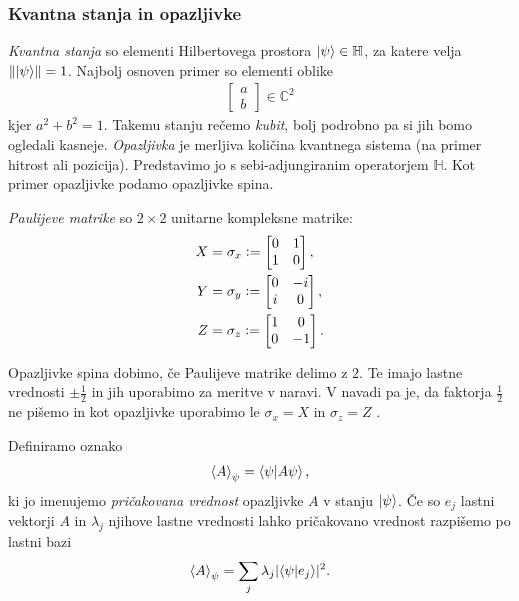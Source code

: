 \documentclass[mat1]{fmfdelo}
\newcommand{\C}{\mathbb C}
\newcommand{\Hb}{\mathbb H}
\newcommand{\defeq}{\vcentcolon=}
\begin{document}
\subsubsection{Kvantna stanja in opazljivke}
\emph{Kvantna stanja} so elementi Hilbertovega prostora \(\ket\psi\in\Hb\), za katere velja \(\norm{\ket\psi} = 1\). Najbolj osnoven primer so elementi oblike 
\begin{align*}
    \begin{bmatrix}a\\b\end{bmatrix} \in \C^2
\end{align*}
kjer \(a^2 + b^2 = 1\). Takemu stanju rečemo \emph{kubit}, bolj podrobno pa si jih bomo ogledali kasneje. \emph{Opazljivka} je merljiva količina kvantnega sistema (na primer hitrost ali pozicija). Predstavimo jo s sebi-adjungiranim operatorjem \(\Hb\). Kot primer opazljivke podamo opazljivke spina.
\begin{definicija} \label{Pauli} \emph{Paulijeve matrike} so \(2\times 2\) unitarne kompleksne matrike:
    \begin{align*}
        X &= \sigma_x \defeq \begin{bmatrix}
            0&1\\
            1&0
        \end{bmatrix},\\
        Y &= \sigma_y \defeq \begin{bmatrix}
            0&-i\\
            i&0
        \end{bmatrix},\\
        Z &= \sigma_z \defeq \begin{bmatrix}
            1&0\\
            0&-1
        \end{bmatrix}.
    \end{align*}
\end{definicija}
Opazljivke spina dobimo, če Paulijeve matrike delimo z \(2\). Te imajo lastne vrednosti \(\pm \frac12\) in jih uporabimo za meritve v naravi. V navadi pa je, da faktorja \(\frac12\) ne pišemo in kot opazljivke uporabimo le \(\sigma_x = X\) in \(\sigma_z = Z\) \cite[Definicija 2.21]{mathforqm}.

 Definiramo oznako
\begin{align*}
    \ev{A}_\psi = \braket{\psi}{A\psi},
\end{align*}
ki jo imenujemo \emph{pričakovana vrednost} opazljivke \(A\) v stanju \(\ket\psi\). Če so \(e_j\) lastni vektorji \(A\) in \(\lambda_j\) njihove lastne vrednosti lahko pričakovano vrednost razpišemo po lastni bazi
\begin{align*}
    \ev{A}_\psi = \sum_j\lambda_j\lvert \braket{\psi}{e_j}\rvert^2.
\end{align*}
\end{document}
